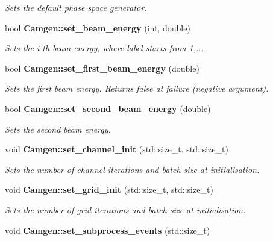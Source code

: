\begin{DoxyCompactItemize}
\begin{DoxyCompactList}\small\item\em Sets the default phase space generator. \end{DoxyCompactList}\item 
\hypertarget{a00849_a3d9a5318e3d8e17cacfba879ab7c8291}{bool {\bfseries Camgen\-::set\-\_\-beam\-\_\-energy} (int, double)}\label{a00849_a3d9a5318e3d8e17cacfba879ab7c8291}

\begin{DoxyCompactList}\small\item\em Sets the i-\/th beam energy, where label starts from 1,... \end{DoxyCompactList}\item 
\hypertarget{a00849_ae2e0cea12c80a74f3bcbac43337e5e88}{bool {\bfseries Camgen\-::set\-\_\-first\-\_\-beam\-\_\-energy} (double)}\label{a00849_ae2e0cea12c80a74f3bcbac43337e5e88}

\begin{DoxyCompactList}\small\item\em Sets the first beam energy. Returns false at failure (negative argument). \end{DoxyCompactList}\item 
bool {\bfseries Camgen\-::set\-\_\-second\-\_\-beam\-\_\-energy} (double)
\begin{DoxyCompactList}\small\item\em Sets the second beam energy. \end{DoxyCompactList}\item 
\hypertarget{a00849_a53fa6d3e2329bf8296ae332aefd5da50}{void {\bfseries Camgen\-::set\-\_\-channel\-\_\-init} (std\-::size\-\_\-t, std\-::size\-\_\-t)}\label{a00849_a53fa6d3e2329bf8296ae332aefd5da50}

\begin{DoxyCompactList}\small\item\em Sets the number of channel iterations and batch size at initialisation. \end{DoxyCompactList}\item 
\hypertarget{a00849_aa1dfc99b70f13b45c913a0cb81e7d62c}{void {\bfseries Camgen\-::set\-\_\-grid\-\_\-init} (std\-::size\-\_\-t, std\-::size\-\_\-t)}\label{a00849_aa1dfc99b70f13b45c913a0cb81e7d62c}

\begin{DoxyCompactList}\small\item\em Sets the number of grid iterations and batch size at initialisation. \end{DoxyCompactList}\item 
\hypertarget{a00849_a19f0b77f8377b972be7709b95baeec3b}{void {\bfseries Camgen\-::set\-\_\-subprocess\-\_\-events} (std\-::size\-\_\-t)}\label{a00849_a19f0b77f8377b972be7709b95baeec3b}


\end{DoxyCompactItemize}
